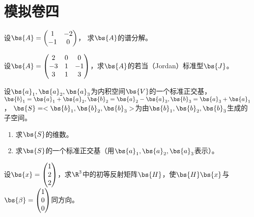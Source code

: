 \documentclass[12pt, a4paper, oneside, UTF8]{ctexbook}
\begin{document}
\else
\fi

\chapter{模拟卷四}
\begin{question} 
   设$\bs{A}=\begin{pmatrix}
    1&-2\\
    -1&0
   \end{pmatrix}$，
   求$\bs{A}$的谱分解。
\end{question}

\begin{question}
    设$\bs{A}=\begin{pmatrix}
        2&0&0\\
        -3&1&-1\\
        3&1&3
    \end{pmatrix}$，求$\bs{A}$的若当（Jordan）标准型$\bs{J}$。
\end{question}

\begin{question}
    设$\bs{a}_1,\bs{a}_2,\bs{a}_3$为内积空间$\bs{V}$的一个标准正交基，
    $\bs{b}_1=\bs{a}_1+\bs{a}_2,\bs{b}_2=\bs{a}_2-\bs{a}_3,\bs{b}_3=\bs{a}_3+\bs{a}_1$，
    $\bs{S}=<\bs{b}_1,\bs{b}_2,\bs{b}_3>$为由$\bs{b}_1,\bs{b}_2,\bs{b}_3$生成的子空间。
    \begin{enumerate}[label=(\arabic{*})]
        \item 求$\bs{S}$的维数。
        \item 求$\bs{S}$的一个标准正交基（用$\bs{a}_1,\bs{a}_2,\bs{a}_3$表示）。
    \end{enumerate}
\end{question}

\begin{question}
    设$\bs{x}=\begin{pmatrix}
        1\\
        2\\
        2
    \end{pmatrix}$，求$\R^3$中的初等反射矩阵$\bs{H}$，使$\bs{H}\bs{x}$与$\bs{\beta}=\begin{pmatrix}
        1\\
        0\\
        0
    \end{pmatrix}$同方向。
\end{question}
\end{document}

